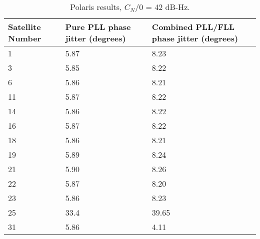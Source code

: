 \begin{table}[!htb]
\centering
\begin{tabular}{|l|l|l|}
\hline
\rowcolor[HTML]{C0C0C0} 
Satellite Number & Pure PLL phase jitter (degrees) & Combined PLL/FLL phase jitter (degrees) \\ \hline
1                & 5.87                            & 8.23                                    \\ \hline
\rowcolor[HTML]{EFEFEF} 
3                & 5.85                            & 8.22                                    \\ \hline
6                & 5.86                            & 8.21                                    \\ \hline
\rowcolor[HTML]{EFEFEF} 
11               & 5.87                            & 8.22                                    \\ \hline
14               & 5.86                            & 8.22                                    \\ \hline
\rowcolor[HTML]{EFEFEF} 
16               & 5.87                            & 8.22                                    \\ \hline
18               & 5.86                            & 8.21                                    \\ \hline
\rowcolor[HTML]{EFEFEF} 
19               & 5.89                            & 8.24                                    \\ \hline
21               & 5.90                            & 8.26                                    \\ \hline
\rowcolor[HTML]{EFEFEF} 
22               & 5.87                            & 8.20                                    \\ \hline
23               & 5.86                            & 8.23                                    \\ \hline
\rowcolor[HTML]{EFEFEF} 
25               & 33.4                            & 39.65                                   \\ \hline
31               & 5.86                            & 4.11                                    \\ \hline
\end{tabular}
\caption{Polaris results, $C_N/0$ = 42 dB-Hz.}
\label{tab:PolarisResultsCNO42}
\end{table}




\clearpage

